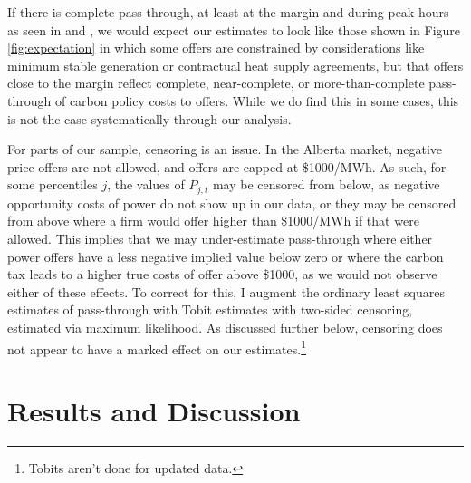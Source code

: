\documentclass[12pt]{article}
\begin{document}
If there is complete pass-through, at least at the margin and during peak hours as seen in \cite{fabra_reguant} and \cite{hintermann16_germany}, we would expect our estimates to look like those shown in Figure \ref{fig:expectation} in which some offers are constrained by considerations like minimum stable generation or contractual heat supply agreements, but that offers close to the margin reflect complete, near-complete, or more-than-complete pass-through of carbon policy costs to offers.  While we do find this in some cases, this is not the case systematically through our analysis.

For parts of our sample, censoring is an issue. In the Alberta market, negative price offers are not allowed, and offers are capped at \$1000/MWh. As such, for some percentiles $j$, the values of $P_{j,t}$ may be censored from below, as negative opportunity costs of power do not show up in our data, or they may be censored from above where a firm would offer higher than \$1000/MWh if that were allowed. This implies that we may under-estimate pass-through where either power offers have a less negative implied value below zero or where the carbon tax leads to a higher true costs of offer above \$1000, as we would not observe either of these effects. To correct for this, I augment the ordinary least squares estimates of pass-through with Tobit estimates with two-sided censoring, estimated via maximum likelihood. As discussed further below, censoring does not appear to have a marked effect on our estimates.\footnote{Tobits aren't done for updated data.}

\section{Results and Discussion}\label{sec:results}
\end{document}
